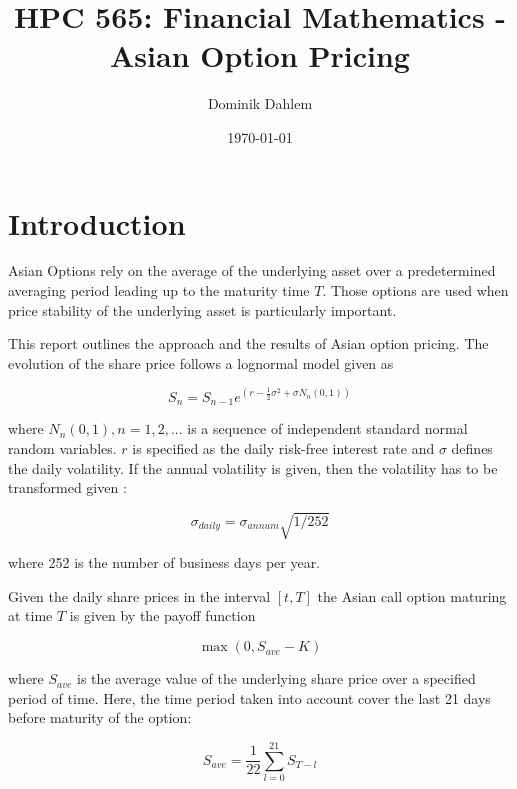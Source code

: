 \documentclass[12pt,a4paper]{article}
\author{Dominik Dahlem}
\title{HPC 565: Financial Mathematics - Asian Option Pricing}
\date{\today}
\begin{document}
\maketitle

\section{Introduction}
\label{sec:introduction}

Asian Options rely on the average of the underlying asset over a
predetermined averaging period leading up to the maturity time
$T$. Those options are used when price stability of the underlying
asset is particularly important.

This report outlines the approach and the results of Asian option
pricing. The evolution of the share price follows a lognormal model
given as

\begin{equation}
  \label{eq:lognormal_model}
  S_{n}=S_{n-1}e^{(r-\frac{1}{2}\sigma^{2}+\sigma N_{n}(0,1))}
\end{equation}

where $N_{n}(0,1), n=1,2,...$ is a sequence of independent standard
normal random variables. $r$ is specified as the daily risk-free
interest rate and $\sigma$ defines the daily volatility. If the annual
volatility is given, then the volatility has to be transformed given
:

\begin{equation}
  \label{eq:sigma_daily}
  \sigma_{daily}=\sigma_{annum}\sqrt{1/252}
\end{equation}

where 252 is the number of business days per year.

Given the daily share prices in the interval $[t,T]$ the Asian call
option maturing at time $T$ is given by the payoff function

\begin{equation}
  \label{eq:payoff}
  \max(0,S_{ave}-K)
\end{equation}

where $S_{ave}$ is the average value of the underlying share price
over a specified period of time. Here, the time period taken into
account cover the last 21 days before maturity of the option:

\begin{equation}
  \label{eq:Saverage}
  S_{ave}=\frac{1}{22}\sum_{l=0}^{21}S_{T-l}
\end{equation}
\end{document}
